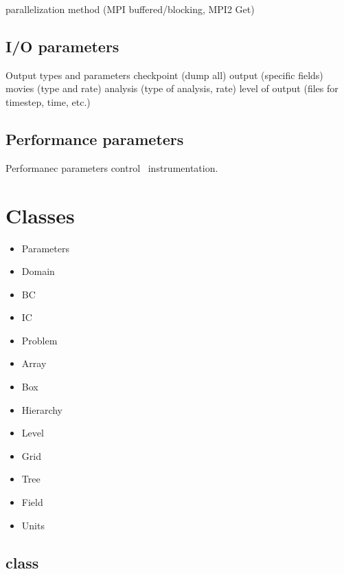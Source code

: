 \documentclass{article}
\begin{document}
   parallelization method (MPI buffered/blocking, MPI2 Get)


\subsection{I/O parameters} 

Output types and parameters
 checkpoint (dump all)
 output (specific fields)
 movies (type and rate)
 analysis (type of analysis, rate)
 level of output (files for timestep, time, etc.)


\subsection{Performance parameters} 

Performanec parameters control \lcaperf\ instrumentation.



\section{Classes} \label{s:classes}

\begin{itemize}
\item Parameters
\item Domain
\item BC
\item IC
\item Problem
\item Array
\item Box
\item Hierarchy
\item Level
\item Grid
\item Tree
\item Field
\item Units
\end{itemize}

\subsection{ class}
\end{document}
